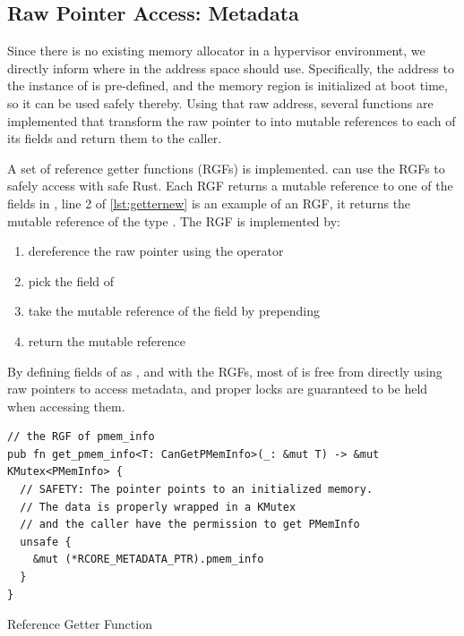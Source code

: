 \subsection{Raw Pointer Access: \rustcore{} Metadata}
Since there is no existing memory allocator in a hypervisor environment,
we directly inform where in the address space \rustcore{} should use.
Specifically, the address to the instance of  is
pre-defined, and the memory region is initialized at boot time,
so it can be used safely thereby.
Using that raw address, several functions are implemented that
transform the raw pointer to  into mutable references to
each of its fields and return them to the caller.

A set of reference getter functions (RGFs) is implemented. \rustcore{}
can use the RGFs to safely access  with safe Rust.
Each RGF returns a mutable reference to one of the fields in ,
line 2 of \autoref{lst:getternew} is an example of an RGF, it returns the
mutable reference of the type . The RGF is implemented by:

\begin{enumerate}
  \item dereference the raw pointer using the \code{*} operator
  \item pick the  field of 
  \item take the mutable reference of the field by prepending 
  \item return the mutable reference
\end{enumerate}

By defining fields of  as , and with
the RGFs, most of \rustcore{} is free from directly using raw pointers to access
\rustcore{} metadata, and proper locks are guaranteed to be held when accessing
them.

\begin{listing}[ht]
    \begin{verbatim}
// the RGF of pmem_info
pub fn get_pmem_info<T: CanGetPMemInfo>(_: &mut T) -> &mut KMutex<PMemInfo> {
  // SAFETY: The pointer points to an initialized memory.
  // The data is properly wrapped in a KMutex
  // and the caller have the permission to get PMemInfo
  unsafe {
    &mut (*RCORE_METADATA_PTR).pmem_info
  }
}
    \end{verbatim}
    \caption{\rustcore{} Reference Getter Function}
    \label{lst:getternew}
    \vspace{-0.2cm}
\end{listing}

